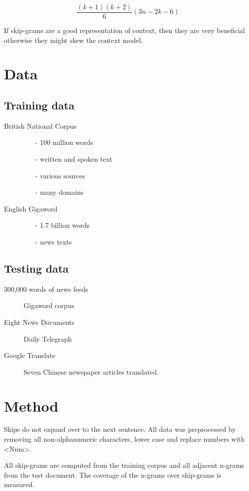 \documentclass{article}
\begin{document}
$$
\frac{(k+1)(k+2)}{6}(3n-2k-6)
$$

If skip-grams are a good representation of context, then they are very beneficial otherwise they might skew the context model.

\section{Data}

\subsection{Training data}
\begin{description}
\item[British National Corpus] \hfill
  \begin{itemize}
  \item[-] 100 million words
  \item[-] written and spoken text
  \item[-] various sources
  \item[-] many domains
  \end{itemize}
\item[English Gigaword] \hfill
  \begin{itemize}
  \item[-] 1.7 billion words
  \item[-] news texts
  \end{itemize}
\end{description}

\subsection{Testing data}
\begin{description}
\item[300,000 words of news feeds] Gigaword corpus
\item[Eight News Documents] Daily Telegraph
\item[Google Translate] Seven Chinese newspaper articles translated.
\end{description}

\section{Method}
Skips do not expand over to the next sentence.
All data was preprocessed by removing all non-alphanumeric characters, lower case and replace numbers with <Num>.

All skip-grams are computed from the training corpus and all adjacent n-grams from the test document.
The coverage of the n-grams over skip-grams is measured.
\end{document}
